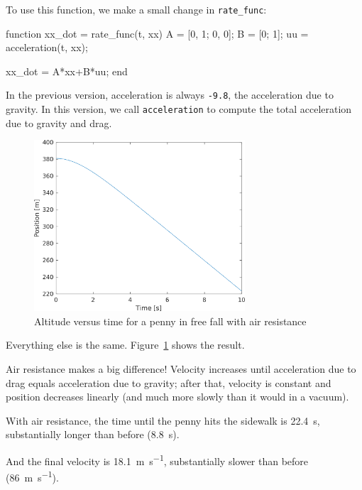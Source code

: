 To use this function, we make a small change in \lstinline{rate_func}:

\begin{code}
function xx_dot = rate_func(t, xx)
    A = [0, 1; 0, 0];
    B = [0; 1];
    uu = acceleration(t, xx);
    
    xx_dot = A*xx+B*uu;
end
\end{code}

In the previous version, acceleration is always \lstinline{-9.8}, the acceleration due to gravity.
In this version, we call \lstinline{acceleration} to compute the total acceleration due to gravity and drag.

\begin{figure}[ht]
\centerline{\includegraphics[width=0.7\textwidth]{../code/chap_secondordersystems/penny_event_drag.png}}
\caption{Altitude versus time for a penny in free fall with air resistance}
\label{fig:penny2}
\end{figure}

Everything else is the same.  Figure~\ref{fig:penny2} shows the result.

Air resistance makes a big difference! Velocity increases until
acceleration due to drag equals acceleration due to gravity; after that, velocity is constant and position decreases linearly (and much more slowly than it would in a vacuum).

With air resistance, the time until the penny hits the sidewalk is \SI{22.4}{\second}, substantially longer than before (\SI{8.8}{\second}).

And the final velocity is \SI{18.1}{\meter \per \second}, substantially slower than before (\SI{86}{\meter \per \second}).

